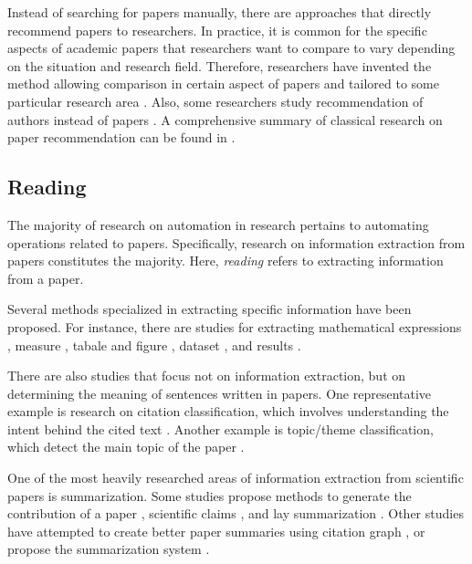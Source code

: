 \documentclass{book}
\begin{document}
Instead of searching for papers manually, there are approaches that directly recommend papers to researchers. In practice, it is common for the specific aspects of academic papers that researchers want to compare to vary depending on the situation and research field. Therefore, researchers have invented the method allowing comparison in certain aspect of papers \cite{ostendorff2020aspect} and tailored to some particular research area \cite{breitinger2022recommending}. Also, some researchers study recommendation of authors instead of papers \cite{portenoy2022bursting}. A comprehensive summary of classical research on paper recommendation can be found in \cite{bai2019scientific}.

\subsection{Reading}
The majority of research on automation in research pertains to automating operations related to papers. Specifically, research on information extraction from papers constitutes the majority. Here, \textit{reading} refers to extracting information from a paper.

Several methods specialized in extracting specific information have been proposed. For instance, there are studies for extracting mathematical expressions \cite{greiner2020math,madisetty2021neural}, measure \cite{harper2021semeval,kohler2021s}, tabale and figure \cite{shen2022vila,hashmi2021current,zhuang2022resel,yamamoto2021visual}, dataset \cite{hou2019identification,kumar2021dataquest,prasad2019dataset}, and results \cite{kardas2020axcell}.

There are also studies that focus not on information extraction, but on determining the meaning of sentences written in papers. One representative example is research on citation classification, which involves understanding the intent behind the cited text \cite{pride2019act,kunnath2021meta,kunnath2022dynamic,kunnath2022act2,lauscher2021multicite}. Another example is topic/theme classification, which detect the main topic of the paper \cite{sadat2022hierarchical,mendoza2022benchmark,salatino2022cso}.

One of the most heavily researched areas of information extraction from scientific papers is summarization. Some studies propose methods to generate the contribution of a paper \cite{hayashi2020s}, scientific claims \cite{wright2022generating}, and lay summarization \cite{goldsack2022making}. Other studies have attempted to create better paper summaries using citation graph \cite{chen2022scientific,an2021enhancing}, or propose the summarization system \cite{erera2019summarization}.
\end{document}
